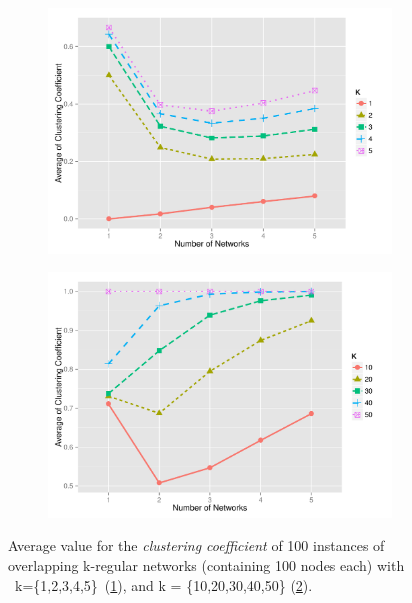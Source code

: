 \documentclass[preprint,number]{elsarticle}
\begin{document}
        \begin{figure}[H]
          \centering
          \begin{subfigure}{.5\linewidth}
		\centering
		\includegraphics[width=1\linewidth]{"../analysis/pdf/network_properties_cc_line_kreg_12345"}
		\caption{}
		\label{fig:network_properties_cc_line_kreg_12345}
              \end{subfigure}%
              \begin{subfigure}{.5\linewidth}
		\centering
		\includegraphics[width=1\linewidth]{"../analysis/pdf/network_properties_cc_line_kreg_1020304050"}
		\caption{}
		\label{fig:network_properties_cc_line_kreg_1020304050}
              \end{subfigure}
              \begin{minipage}{0.9\textwidth}
		\vspace{0.2cm}
		\caption{Average value for the \textit{clustering coefficient} of 100 instances of overlapping k-regular networks (containing 100 nodes each) with ~k=\{1,2,3,4,5\}~(\ref{fig:network_properties_cc_line_kreg_12345}), and  k = \{10,20,30,40,50\} (\ref{fig:network_properties_cc_line_kreg_1020304050}).}
		\label{fig:network_properties_cc_line_kreg}
              \end{minipage}
        \end{figure}
\end{document}
